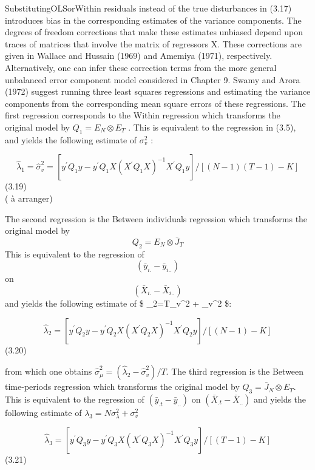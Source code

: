 \documentclass[
]{book}
\begin{document}
SubstitutingOLSorWithin residuals instead of the true disturbances in (3.17) introduces bias in
the corresponding estimates of the variance components. The degrees of freedom corrections
that make these estimates unbiased depend upon traces of matrices that involve the matrix
of regressors X. These corrections are given in Wallace and Hussain (1969) and Amemiya
(1971), respectively. Alternatively, one can infer these correction terms from the more general
unbalanced error component model considered in Chapter 9.
Swamy and Arora (1972) suggest running three least squares regressions and estimating
the variance components from the corresponding mean square errors of these regressions. The
first regression corresponds to the Within regression which transforms the original model by
\(Q_1=E_N \otimes E_T\) . This is equivalent to the regression in (3.5), and yields the following estimate
of \(\sigma_v^2\) :

\begin{equation}
\widehat{\lambda}_{1}=\widehat{\sigma}_{v}^{2}=\left[y^{\prime} Q_{1} y-y^{\prime} Q_{1} X\left(X^{\prime} Q_{1} X\right)^{-1} X^{\prime} Q_{1} y\right] /[(N-1)(T-1)-K]
\end{equation} (3.19)\\
( à arranger)

The second regression is the Between individuals regression which transforms the original
model by \[Q_2=E_N \otimes \bar{J}_T \] This is equivalent to the regression of \[ (\bar{y}_{i.}- \bar{y}_{i..}) \] on
\[ (\bar{X}_{i.}- \bar{X}_{i..}) \]
and yields the following estimate of
\$ \lambda\_2=T\sigma\_v\^{}2 + \sigma\_v\^{}2 \$:

\begin{equation}
\widehat{\lambda}_{2}=\left[y^{\prime} Q_{2} y-y^{\prime} Q_{2} X\left(X^{\prime} Q_{2} X\right)^{-1} X^{\prime} Q_{2} y\right] /[(N-1)-K]
\end{equation} (3.20)

from which one obtains \(\widehat{\sigma}_{\mu}^{2}=\left(\widehat{\lambda}_{2}-\widehat{\sigma}_{v}^{2}\right) / T .\) The third regression is the Between time-periods regression which transforms the original model by \(Q_{3}=\bar{J}_{N} \otimes E_{T}\). This is equivalent to the regression of \(\left(\bar{y}_{. t}-\bar{y}_{. .}\right)\) on \(\left(\bar{X}_{. t}-\bar{X}_{. .}\right)\) and yields the following estimate of \(\lambda_{3}=N \sigma_{\lambda}^{2}+\sigma_{v}^{2}\)

\begin{equation}
\widehat{\lambda}_{3}=\left[y^{\prime} Q_{3} y-y^{\prime} Q_{3} X\left(X^{\prime} Q_{3} X\right)^{-1} X^{\prime} Q_{3} y\right] /[(T-1)-K]
\end{equation} (3.21)
\end{document}
